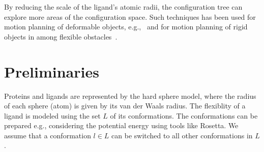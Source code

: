 \documentclass{svmult}
\def\probe{r_{\mathrm{probe}}}
\def\Sprobe{S_{\mathrm{probe}}}
\def\SS{\mathbf{S}}
\def\L{L}
\begin{document}
%


By reducing the scale of the ligand's atomic radii, the configuration tree can explore more areas of the configuration space.
Such techniques has been used for motion planning of deformable objects, 
e.g.,~\cite{frank2008efficient,bayazit2001ligand,alterovitz2008motion,lamiraux2001flexible,kavraki1998towards,gayle2005path} 
and for motion planning of rigid objects in among 
flexible obstacles~\cite{rodriguez2006planning,frank2008efficient,phillips2014representation}.


\section{Preliminaries}

Proteins and ligands are represented by the hard sphere model, where the radius of each sphere (atom) is given by its van der Waals radius.
The flexiblity of a ligand is modeled using the set $\L$ of its conformations.
The conformations can be prepared e.g., considering the potential energy using tools like Rosetta.
We assume that a conformation $l \in \L$ can be switched to all other conformations in $\L$.

\end{document}
